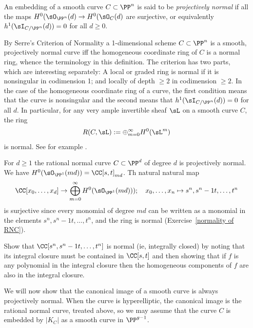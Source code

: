  
\begin{definition} An embedding of a smooth curve
$C\subset \PP^n$ is said to be \emph{projectively normal} if all the maps $H^0(\sO_{\PP^n}(d) \to H^0(\sO_C(d)$ are surjective,
or equivalently $h^1(\sI_{C/\PP^n}(d))=0$ for all $d\geq 0$.
\end{definition}
 
By Serre's Criterion of Normality  a 1-dimensional scheme  $C\subset \PP^n$
is a smooth, projectively normal curve iff the homogeneous coordinate ring of $C$ is a normal ring, whence the terminology in
this definition. The criterion has two parts, which are interesting separately: A local or graded ring is normal if it is nonsingular in
codimension 1; and
locally of depth $\geq 2$ in codimension $\geq 2$. In the case of the homogeneous coordinate ring of a curve, 
the first condition means that the curve is nonsingular and the second means that $h^1(\sI_{C/\PP^n}(d))=0$ for all $d$.
In particular, for any very ample invertible sheaf $\sL$ on a smooth curve $C$, the ring 
$$
R(C, \sL) := \oplus_{m=0}^\infty H^0(\sL^m)
$$
is normal. See for example \cite[Theorem ***]{Eisenbud1995}.

\begin{example}\label{rnc is projectively normal}
For $d\geq 1$ the rational normal curve $C\subset \PP^d$ of degree $d$ is projectively normal. 
We have $H^0(\sO_{\PP^1}(md))  = \CC[s,t]_{md}$. Th natural natural map
$$
\CC[x_0,\dots,x_d] \to\bigoplus_{m = 0}^\infty H^0(\sO_{\PP^1}(md)));\quad x_0,\dots, x_n \mapsto s^n,s^n-1t,\dots, t^n
$$ 
is surjective since every monomial of degree $md$ can be written as a monomial in  
the elements $s^n,s^n-1t,\dots, t^n$, and the ring is normal (Exercise~\ref{normality of RNC}).
\end{example}

\begin{exercise}\label{normality of RNC}
 Show that $\CC[s^n,s^n-1t,\dots, t^n]$ is normal (ie, integrally closed) by noting that its integral closure must be
 contained in $\CC[s,t]$ and then showing that if $f$ is any polynomial
 in the integral closure then the homogeneous components of $f$ are also in the integral closure.
\end{exercise}


We will now show that the canonical image of a smooth curve is always projectively normal. When the curve is hyperelliptic,
the canonical image is the rational normal curve, treated above, so we may assume that the curve $C$ is embedded
by $|K_C|$ as a smooth curve in $\PP^{g-1}$.


